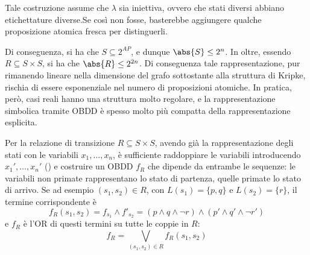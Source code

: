 Tale costruzione assume che \(\lambda\) sia iniettiva, ovvero che stati diversi abbiano etichettature diverse.Se così non fosse, basterebbe aggiungere qualche proposizione atomica fresca per distinguerli.

Di conseguenza, si ha che \(S \subseteq 2^{AP}\), e dunque \(\abs{S} \leq 2^n\). In oltre, essendo \(R \subseteq S \times S\), si ha che \(\abs{R} \leq 2^{2n}\). Di conseguenza tale rappresentazione, pur rimanendo lineare nella dimensione del grafo sottostante alla struttura di Kripke, rischia di essere esponenziale nel numero di proposizioni atomiche. In pratica, però, casi reali hanno una struttura molto regolare, e la rappresentazione simbolica tramite OBDD è spesso molto più compatta della rappresentazione esplicita.

Per la relazione di transizione \(R\subseteq S\times S\), avendo già la rappresentazione degli stati con le variabili \(x_1, \ldots, x_{n}\), è sufficiente raddoppiare le variabili introducendo \(x_1', \ldots, x_{n}'\) () e costruire un OBDD \(f_R\) che dipende da entrambe le sequenze: le variabili non primate rappresentano lo stato di partenza, quelle primate lo stato di arrivo. Se ad esempio \((s_1,s_2)\in R\), con \(L(s_1)=\{p,q\}\) e \(L(s_2)=\{r\}\), il termine corrispondente è
\[f_R(s_1,s_2) = f_{s_1}\land f'_{s_2} = (p\land q\land\neg r)\land(p'\land q'\land\neg r')\]
e \(f_R\) è l'OR di questi termini su tutte le coppie in \(R\):
\[f_R = \bigvee_{(s_1,s_2)\in R} f_R(s_1,s_2)\]

